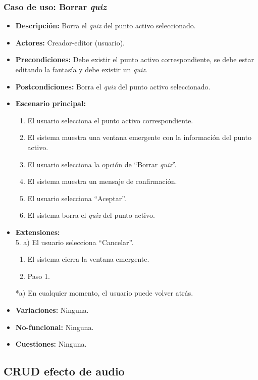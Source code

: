 \subsubsection{Caso de uso: Borrar \textit{quiz}}
\begin{itemize}
	\item \textbf{Descripción:} Borra el \textit{quiz} del punto activo seleccionado.
	\item \textbf{Actores:} Creador-editor (usuario).
	\item \textbf{Precondiciones:} Debe existir el punto activo correspondiente, se debe estar editando la fantasía y debe existir un \textit{quiz}.
	\item \textbf{Postcondiciones:} Borra el \textit{quiz} del punto activo seleccionado.
	\item \textbf{Escenario principal:}
	\begin{enumerate}
		\item El usuario selecciona el punto activo correspondiente.
		\item El sistema muestra una ventana emergente con la información del punto activo.
		\item El usuario selecciona la opción de ``Borrar \textit{quiz}''.
		\item El sistema muestra un mensaje de confirmación.
		\item El usuario selecciona ``Aceptar''.
		\item El sistema borra el \textit{quiz} del punto activo.
	\end{enumerate}
	\item \textbf{Extensiones:} \\ 5. a) El usuario selecciona ``Cancelar''.
	\begin{enumerate}
		\item El sistema cierra la ventana emergente.
		\item Paso 1.
	\end{enumerate}
	*a) En cualquier momento, el usuario puede volver atrás.
	\item \textbf{Variaciones:} Ninguna.
	\item \textbf{No-funcional:} Ninguna.
	\item \textbf{Cuestiones:} Ninguna.
\end{itemize}

\subsection{CRUD efecto de audio}
\hypertarget{crearaudio}{}
